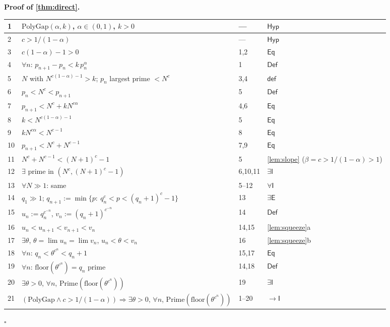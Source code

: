 \documentclass[11pt,reqno]{amsart}
\theoremstyle{blueplain}
\renewcommand{\qedsymbol}{\textcolor{proofqed}{\ensuremath{\square}}}
\renewenvironment{proof}[1][Proof]{\par\noindent\textbf{\textcolor{proofhead}{#1.}}\par\nobreak}{\par\nobreak\hfill\qedsymbol}
\numberwithin{equation}{section}
\begin{document}
\begin{proof}[\textbf{Proof of \cref{thm:direct}}]
	\label{proof:direct}
	{\scriptsize
		\begin{tabular}{|m{0.7cm}|m{12cm}|m{1.4cm}|m{2.5cm}|}
			\hline
			1 & $\mathrm{PolyGap}(\alpha,k)$, $\alpha\in(0,1)$, $k>0$ & --- & $\mathsf{Hyp}$ \\ \hline
			2 & $c>1/(1-\alpha)$ & --- & $\mathsf{Hyp}$ \\ \hline
			3 & $c(1-\alpha)-1>0$ & 1,2 & $\mathsf{Eq}$ \\ \hline
			4 & $\forall n$: $p_{n+1}-p_n<k\,p_n^{\alpha}$ & 1 & $\mathsf{Def}$ \\ \hline
			5 & $N$ with $N^{c(1-\alpha)-1}>k$; $p_n$ largest prime $<N^{c}$ & 3,4 & $\mathsf{def}$ \\ \hline
			6 & $p_n<N^{c}<p_{n+1}$ & 5 & $\mathsf{Def}$ \\ \hline
			7 & $p_{n+1}<N^{c}+k N^{c\alpha}$ & 4,6 & $\mathsf{Eq}$ \\ \hline
			8 & $k<N^{c(1-\alpha)-1}$ & 5 & $\mathsf{Eq}$ \\ \hline
			9 & $k N^{c\alpha}<N^{c-1}$ & 8 & $\mathsf{Eq}$ \\ \hline
			10 & $p_{n+1}<N^{c}+N^{c-1}$ & 7,9 & $\mathsf{Eq}$ \\ \hline
			11 & $N^{c}+N^{c-1}<(N+1)^{c}-1$ & 5 & \cref{lem:slope} ($\beta=c>1/(1-\alpha)>1$) \\ \hline
			12 & $\exists$ prime in $(N^{c},(N+1)^{c}-1)$ & 6,10,11 & $\exists\mathsf{I}$ \\ \hline
			13 & $\forall N\gg 1$: same & 5--12 & $\forall\mathsf{I}$ \\ \hline
			14 & $q_1\gg 1$; $q_{n+1}:=\min\{p:\ q_n^{c}<p<(q_n+1)^{c}-1\}$ & 13 & $\exists\mathsf{E}$ \\ \hline
			15 & $u_n:=q_n^{c^{-n}}$, $v_n:=(q_n+1)^{c^{-n}}$ & 14 & $\mathsf{Def}$ \\ \hline
			16 & $u_n<u_{n+1}<v_{n+1}<v_n$ & 14,15 & \cref{lem:squeeze}a \\ \hline
			17 & $\exists\theta$, $\theta=\lim u_n=\lim v_n$, $u_n<\theta<v_n$ & 16 & \cref{lem:squeeze}b \\ \hline
			18 & $\forall n$: $q_n<\theta^{c^{n}}<q_n+1$ & 15,17 & $\mathsf{Eq}$ \\ \hline
			19 & $\forall n$: $\mathrm{floor}(\theta^{c^{n}})=q_n$ prime & 14,18 & $\mathsf{Def}$ \\ \hline
			20 & $\exists\theta>0$, $\forall n$, $\mathrm{Prime}(\mathrm{floor}(\theta^{c^{n}}))$ & 19 & $\exists\mathsf{I}$ \\ \hline
			21 & $(\mathrm{PolyGap}\wedge c>1/(1-\alpha))\Rightarrow\exists\theta>0$, $\forall n$, $\mathrm{Prime}(\mathrm{floor}(\theta^{c^{n}}))$ & 1--20 & $\rightarrow\mathsf{I}$ \\ \hline
		\end{tabular}
	}
\end{proof}
\end{document}
